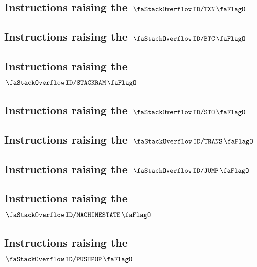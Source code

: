 \subsection{Instructions raising the $\stackDecTxnFlag$           \lispDone{}}   \label{hub: instruction handling: txn}                    
\subsection{Instructions raising the $\stackDecBtcFlag$           \lispDone{}}   \label{hub: instruction handling: btc}                    
\subsection{Instructions raising the $\stackDecStackRamFlag$      \lispDone{}}   \label{hub: instruction handling: stackRam}               
\subsection{Instructions raising the $\stackDecStoFlag$           \lispDone{}}   \label{hub: instruction handling: sto}                    
\subsection{Instructions raising the $\stackDecTransFlag$         \lispDone{}}   \label{hub: instruction handling: transient}              
\subsection{Instructions raising the $\stackDecJumpFlag$          \lispDone{}}   \label{hub: instruction handling: jump}                   
\subsection{Instructions raising the $\stackDecMachineStateFlag$  \lispDone{}}   \label{hub: instruction handling: machineState}           
\subsection{Instructions raising the $\stackDecPushPopFlag$       \lispDone{}}   \label{hub: instruction handling: pushPop}                
